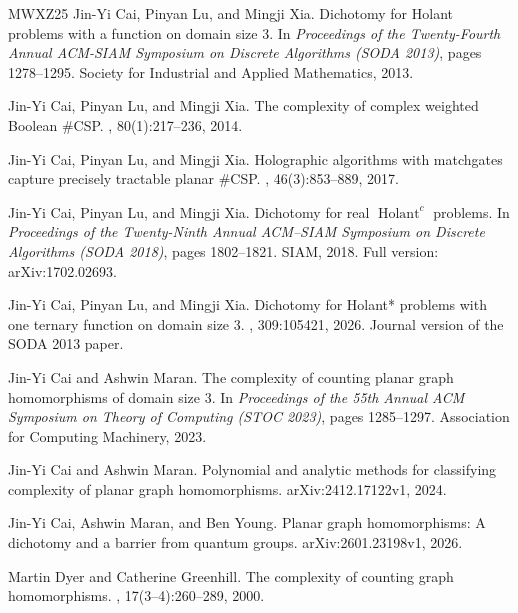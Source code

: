\documentclass[11pt,letterpaper,onecolumn]{article}
\theoremstyle{plain}
\theoremstyle{definition}
\theoremstyle{remark}
\begin{document}
\begin{thebibliography}{MWXZ25}
Jin-Yi Cai, Pinyan Lu, and Mingji Xia.
\newblock Dichotomy for {Holant} problems with a function on domain size 3.
\newblock In {\em Proceedings of the Twenty-Fourth Annual ACM-SIAM Symposium on
  Discrete Algorithms (SODA 2013)}, pages 1278--1295. Society for Industrial
  and Applied Mathematics, 2013.

Jin-Yi Cai, Pinyan Lu, and Mingji Xia.
\newblock The complexity of complex weighted {Boolean} {{\#CSP}}.
, 80(1):217--236, 2014.

Jin-Yi Cai, Pinyan Lu, and Mingji Xia.
\newblock Holographic algorithms with matchgates capture precisely tractable
  planar {{\#CSP}}.
, 46(3):853--889, 2017.

Jin-Yi Cai, Pinyan Lu, and Mingji Xia.
\newblock Dichotomy for real {$\operatorname{Holant}^{c}$} problems.
\newblock In {\em Proceedings of the Twenty-Ninth Annual ACM--SIAM Symposium on
  Discrete Algorithms (SODA 2018)}, pages 1802--1821. SIAM, 2018.
\newblock Full version: arXiv:1702.02693.

Jin-Yi Cai, Pinyan Lu, and Mingji Xia.
\newblock Dichotomy for {Holant*} problems with one ternary function on domain
  size 3.
, 309:105421, 2026.
\newblock Journal version of the SODA 2013 paper.

Jin-Yi Cai and Ashwin Maran.
\newblock The complexity of counting planar graph homomorphisms of domain size
  3.
\newblock In {\em Proceedings of the 55th Annual ACM Symposium on Theory of
  Computing (STOC 2023)}, pages 1285--1297. Association for Computing
  Machinery, 2023.

Jin-Yi Cai and Ashwin Maran.
\newblock Polynomial and analytic methods for classifying complexity of planar
  graph homomorphisms.
\newblock arXiv:2412.17122v1, 2024.

Jin-Yi Cai, Ashwin Maran, and Ben Young.
\newblock Planar graph homomorphisms: A dichotomy and a barrier from quantum
  groups.
\newblock arXiv:2601.23198v1, 2026.

Martin Dyer and Catherine Greenhill.
\newblock The complexity of counting graph homomorphisms.
, 17(3--4):260--289, 2000.


\end{thebibliography}
\end{document}
